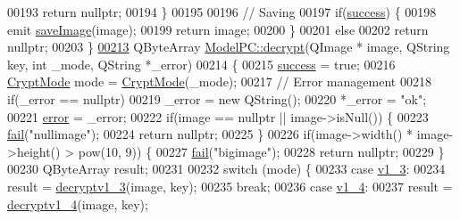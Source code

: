 \begin{DoxyCode}
00193         \textcolor{keywordflow}{return} \textcolor{keyword}{nullptr};
00194     \}
00195 
00196     \textcolor{comment}{// Saving}
00197     \textcolor{keywordflow}{if}(\hyperlink{class_model_p_c_a945ffbbc44a832b953c191debd448f4c}{success}) \{
00198         emit \hyperlink{class_model_p_c_a41f5e2e8022679046e4d3fa1109025fa}{saveImage}(image);
00199         \textcolor{keywordflow}{return} image;
00200     \}
00201     \textcolor{keywordflow}{else}
00202         \textcolor{keywordflow}{return} \textcolor{keyword}{nullptr};
00203 \}
\hypertarget{modelpc_8cpp_source_l00213}{}\hyperlink{class_model_p_c_a5995215a34a1e1f504035715a8013809}{00213} QByteArray \hyperlink{class_model_p_c_a5995215a34a1e1f504035715a8013809}{ModelPC::decrypt}(QImage * image, QString key, \textcolor{keywordtype}{int} \_mode, QString *\_error)
00214 \{
00215     \hyperlink{class_model_p_c_a945ffbbc44a832b953c191debd448f4c}{success} = \textcolor{keyword}{true};
00216     \hyperlink{class_model_p_c_a296dd7afe3e1c49b3da25fd644fe4ceb}{CryptMode} mode = \hyperlink{class_model_p_c_a296dd7afe3e1c49b3da25fd644fe4ceb}{CryptMode}(\_mode);
00217     \textcolor{comment}{// Error management}
00218     \textcolor{keywordflow}{if}(\_error == \textcolor{keyword}{nullptr})
00219         \_error = \textcolor{keyword}{new} QString();
00220     *\_error = \textcolor{stringliteral}{"ok"};
00221     \hyperlink{class_model_p_c_a4e5a9c0ca1f06fe5bc478b6bf248c37c}{error} = \_error;
00222     \textcolor{keywordflow}{if}(image == \textcolor{keyword}{nullptr} || image->isNull()) \{
00223         \hyperlink{class_model_p_c_a47464b59b7e37fcee25e55475708aabd}{fail}(\textcolor{stringliteral}{"nullimage"});
00224         \textcolor{keywordflow}{return} \textcolor{keyword}{nullptr};
00225     \}
00226     \textcolor{keywordflow}{if}(image->width() * image->height() > pow(10, 9)) \{
00227         \hyperlink{class_model_p_c_a47464b59b7e37fcee25e55475708aabd}{fail}(\textcolor{stringliteral}{"bigimage"});
00228         \textcolor{keywordflow}{return} \textcolor{keyword}{nullptr};
00229     \}
00230     QByteArray result;
00231 
00232     \textcolor{keywordflow}{switch} (mode) \{
00233     \textcolor{keywordflow}{case} \hyperlink{class_model_p_c_a296dd7afe3e1c49b3da25fd644fe4ceba7612e38de7178170655a56ddcf96e12c}{v1\_3}:
00234         result = \hyperlink{class_model_p_c_a4fe70ebbedfaf31d45a35f82d0f06caa}{decryptv1\_3}(image, key);
00235     \textcolor{keywordflow}{break};
00236     \textcolor{keywordflow}{case} \hyperlink{class_model_p_c_a296dd7afe3e1c49b3da25fd644fe4ceba43138df6b33a6b2bf608768907f95abc}{v1\_4}:
00237         result = \hyperlink{class_model_p_c_a7a1f7d491e1bde16936190b9e90896b0}{decryptv1\_4}(image, key);

\end{DoxyCode}
